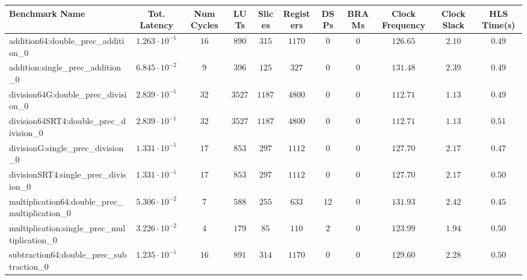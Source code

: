 \begin{tabular}{|l|c|c|c|c|c|c|c|c|c|c|}
\hline
Benchmark Name                                   & Tot. Latency            & Num Cycles & LUTs      & Slices   & Registers & DSPs   & BRAMs & Clock Frequency & Clock Slack & HLS Time(s) \\
\hline
addition64:double\_prec\_addition\_0             & $ 1.263 \cdot 10^{-1} $ & $ 16     $ & $ 890   $ & $ 315  $ & $ 1170  $ & $ 0  $ & $ 0 $ & $ 126.65      $ & $ 2.10    $ & $ 0.49    $ \\
addition:single\_prec\_addition\_0               & $ 6.845 \cdot 10^{-2} $ & $ 9      $ & $ 396   $ & $ 125  $ & $ 327   $ & $ 0  $ & $ 0 $ & $ 131.48      $ & $ 2.39    $ & $ 0.49    $ \\
division64G:double\_prec\_division\_0            & $ 2.839 \cdot 10^{-1} $ & $ 32     $ & $ 3527  $ & $ 1187 $ & $ 4800  $ & $ 0  $ & $ 0 $ & $ 112.71      $ & $ 1.13    $ & $ 0.49    $ \\
division64SRT4:double\_prec\_division\_0         & $ 2.839 \cdot 10^{-1} $ & $ 32     $ & $ 3527  $ & $ 1187 $ & $ 4800  $ & $ 0  $ & $ 0 $ & $ 112.71      $ & $ 1.13    $ & $ 0.51    $ \\
divisionG:single\_prec\_division\_0              & $ 1.331 \cdot 10^{-1} $ & $ 17     $ & $ 853   $ & $ 297  $ & $ 1112  $ & $ 0  $ & $ 0 $ & $ 127.70      $ & $ 2.17    $ & $ 0.47    $ \\
divisionSRT4:single\_prec\_division\_0           & $ 1.331 \cdot 10^{-1} $ & $ 17     $ & $ 853   $ & $ 297  $ & $ 1112  $ & $ 0  $ & $ 0 $ & $ 127.70      $ & $ 2.17    $ & $ 0.50    $ \\
multiplication64:double\_prec\_multiplication\_0 & $ 5.306 \cdot 10^{-2} $ & $ 7      $ & $ 588   $ & $ 255  $ & $ 633   $ & $ 12 $ & $ 0 $ & $ 131.93      $ & $ 2.42    $ & $ 0.45    $ \\
multiplication:single\_prec\_multiplication\_0   & $ 3.226 \cdot 10^{-2} $ & $ 4      $ & $ 179   $ & $ 85   $ & $ 110   $ & $ 2  $ & $ 0 $ & $ 123.99      $ & $ 1.94    $ & $ 0.50    $ \\
subtraction64:double\_prec\_subtraction\_0       & $ 1.235 \cdot 10^{-1} $ & $ 16     $ & $ 891   $ & $ 314  $ & $ 1170  $ & $ 0  $ & $ 0 $ & $ 129.60      $ & $ 2.28    $ & $ 0.50    $ \\

\end{tabular}
